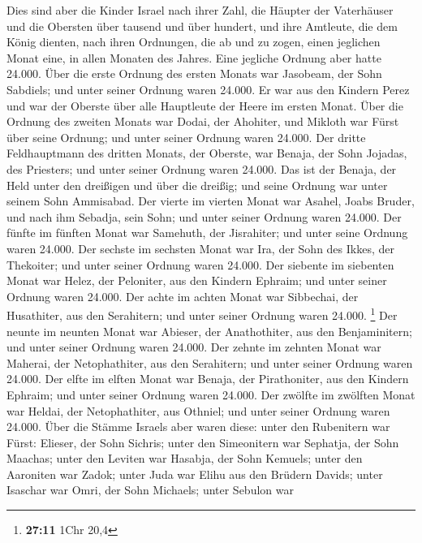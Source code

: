  Dies sind aber die Kinder Israel nach ihrer Zahl, die
Häupter der Vaterhäuser und die Obersten über tausend und über hundert,
und ihre Amtleute, die dem König dienten, nach ihren Ordnungen, die ab
und zu zogen, einen jeglichen Monat eine, in allen Monaten des Jahres.
Eine jegliche Ordnung aber hatte 24.000.  Über die erste
Ordnung des ersten Monats war Jasobeam, der Sohn Sabdiels; und unter
seiner Ordnung waren 24.000.  Er war aus den Kindern Perez
und war der Oberste über alle Hauptleute der Heere im ersten Monat.
 Über die Ordnung des zweiten Monats war Dodai, der
Ahohiter, und Mikloth war Fürst über seine Ordnung; und unter seiner
Ordnung waren 24.000.  Der dritte Feldhauptmann des
dritten Monats, der Oberste, war Benaja, der Sohn Jojadas, des
Priesters; und unter seiner Ordnung waren 24.000.  Das ist
der Benaja, der Held unter den dreißigen und über die dreißig; und seine
Ordnung war unter seinem Sohn Ammisabad.  Der vierte im
vierten Monat war Asahel, Joabs Bruder, und nach ihm Sebadja, sein Sohn;
und unter seiner Ordnung waren 24.000.  Der fünfte im
fünften Monat war Samehuth, der Jisrahiter; und unter seine Ordnung
waren 24.000.  Der sechste im sechsten Monat war Ira, der
Sohn des Ikkes, der Thekoiter; und unter seiner Ordnung waren 24.000.
 Der siebente im siebenten Monat war Helez, der
Peloniter, aus den Kindern Ephraim; und unter seiner Ordnung waren
24.000.  Der achte im achten Monat war Sibbechai, der
Husathiter, aus den Serahitern; und unter seiner Ordnung waren 24.000.
\footnote{\textbf{27:11} 1Chr 20,4}  Der neunte im
neunten Monat war Abieser, der Anathothiter, aus den Benjaminitern; und
unter seiner Ordnung waren 24.000.  Der zehnte im zehnten
Monat war Maherai, der Netophathiter, aus den Serahitern; und unter
seiner Ordnung waren 24.000.  Der elfte im elften Monat
war Benaja, der Pirathoniter, aus den Kindern Ephraim; und unter seiner
Ordnung waren 24.000.  Der zwölfte im zwölften Monat war
Heldai, der Netophathiter, aus Othniel; und unter seiner Ordnung waren
24.000.  Über die Stämme Israels aber waren diese: unter
den Rubenitern war Fürst: Elieser, der Sohn Sichris; unter den
Simeonitern war Sephatja, der Sohn Maachas;  unter den
Leviten war Hasabja, der Sohn Kemuels; unter den Aaroniten war Zadok;
 unter Juda war Elihu aus den Brüdern Davids; unter
Isaschar war Omri, der Sohn Michaels;  unter Sebulon war
